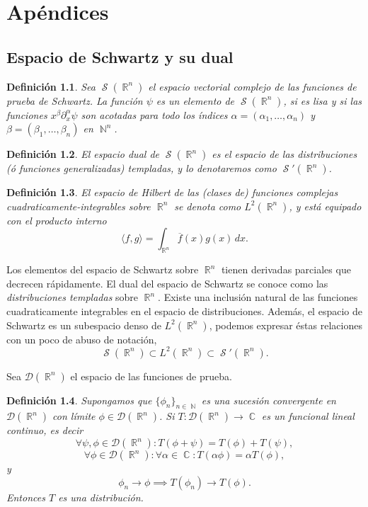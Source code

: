 \documentclass[a4paper]{report}
\DeclareMathOperator{\R}{\mathbb{R}}
\DeclareMathOperator{\C}{\mathbb{C}}
\DeclareMathOperator{\N}{\mathbb{N}}
\DeclareMathOperator{\Sz}{\mathcal S}
\newtheorem{definition}{Definición}
\begin{document}
  \newpage
  \appendix

  \chapter{Apéndices}

  \section{Espacio de Schwartz y su dual}

  \begin{definition}
    Sea $\Sz(\R^{n})$ el espacio vectorial complejo
    de las funciones de prueba de Schwartz. La función
    $\psi$ es un elemento de $\Sz(\R^{n})$, si es
    lisa y si las funciones $x^{\beta} \partial_x^{\alpha}
    \psi$ son acotadas para todo los índices $\alpha =
    (\alpha_1, \ldots, \alpha_n)$ y $\beta = (\beta_1,
    \ldots, \beta_n)$ en $\N^{n}$.
  \end{definition}

  \begin{definition}
    El espacio dual de $\Sz(\R^{n})$ es el espacio de
    las distribuciones (ó funciones generalizadas)
    templadas, y lo denotaremos como $\Sz'(\R^{n})$.
  \end{definition}

  \begin{definition}
    El espacio de Hilbert de las (clases de) funciones
    complejas cuadraticamente-integrables sobre $\R^{n}$ se
    denota como $L^2(\R^{n})$, y está equipado con el
    producto interno
    \[
      \langle f, g \rangle
      = \int_{\R^{n}} \overline{f}(x) g(x) \, dx.
    \] 
  \end{definition}
 
  Los elementos del espacio de Schwartz sobre $\R^{n}$
  tienen derivadas parciales que decrecen rápidamente. El
  dual del espacio de Schwartz se conoce como las
  \textit{distribuciones templadas} sobre $\R^{n}$. Existe
  una inclusión natural de las funciones cuadraticamente
  integrables en el espacio de distribuciones. Además, el
  espacio de Schwartz es un subespacio denso de
  $L^2(\R^{n})$, podemos expresar éstas relaciones con un
  poco de abuso de notación,
  \[
    \Sz(\R^{n})
    \subset L^2(\R^{n})
    \subset \Sz'(\R^{n}).
  \]

  Sea $\mathcal D(\R^{n})$ el espacio de las funciones de
  prueba.

  \begin{definition}
    Supongamos que $\{\phi_n\}_{n \in \N}$ es una sucesión
    convergente en $\mathcal D(\R^{n})$ con límite $\phi \in
    \mathcal D(\R^{n})$. Si $T : \mathcal D(\R^{n}) \to \C$
    es un funcional lineal continuo, es decir
    \[
      \forall \psi, \phi \in \mathcal D(\R^{n}) : T(\phi +
      \psi) = T(\phi) + T(\psi),
    \] 
    \[
      \forall \phi \in \mathcal D(\R^{n}) : \forall \alpha
      \in \C : T(\alpha \phi) = \alpha T(\phi),
    \] 
    y
    \[
      \phi_n \to \phi \implies T(\phi_n) \to T(\phi).
    \] 
    Entonces $T$ es una distribución.
  \end{definition}
\end{document}
